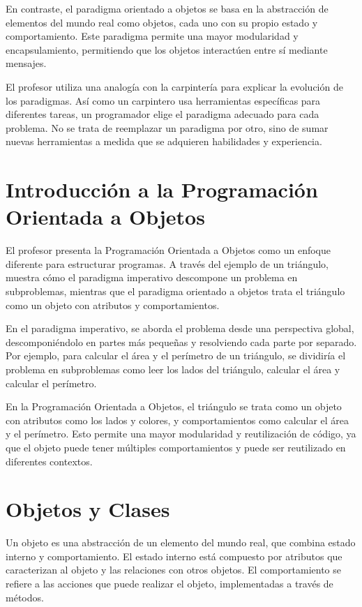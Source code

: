 \documentclass[a4paper]{report}
\begin{document}
En contraste, el paradigma orientado a objetos se basa en la abstracción de elementos del mundo real como objetos, cada uno con su propio estado y comportamiento. Este paradigma permite una mayor modularidad y encapsulamiento, permitiendo que los objetos interactúen entre sí mediante mensajes.

El profesor utiliza una analogía con la carpintería para explicar la evolución de los paradigmas. Así como un carpintero usa herramientas específicas para diferentes tareas, un programador elige el paradigma adecuado para cada problema. No se trata de reemplazar un paradigma por otro, sino de sumar nuevas herramientas a medida que se adquieren habilidades y experiencia.

\section{Introducción a la Programación Orientada a Objetos}
El profesor presenta la Programación Orientada a Objetos como un enfoque diferente para estructurar programas. A través del ejemplo de un triángulo, muestra cómo el paradigma imperativo descompone un problema en subproblemas, mientras que el paradigma orientado a objetos trata el triángulo como un objeto con atributos y comportamientos.

En el paradigma imperativo, se aborda el problema desde una perspectiva global, descomponiéndolo en partes más pequeñas y resolviendo cada parte por separado. Por ejemplo, para calcular el área y el perímetro de un triángulo, se dividiría el problema en subproblemas como leer los lados del triángulo, calcular el área y calcular el perímetro.

En la Programación Orientada a Objetos, el triángulo se trata como un objeto con atributos como los lados y colores, y comportamientos como calcular el área y el perímetro. Esto permite una mayor modularidad y reutilización de código, ya que el objeto puede tener múltiples comportamientos y puede ser reutilizado en diferentes contextos.

\section{Objetos y Clases}
Un objeto es una abstracción de un elemento del mundo real, que combina estado interno y comportamiento. El estado interno está compuesto por atributos que caracterizan al objeto y las relaciones con otros objetos. El comportamiento se refiere a las acciones que puede realizar el objeto, implementadas a través de métodos.
\end{document}
